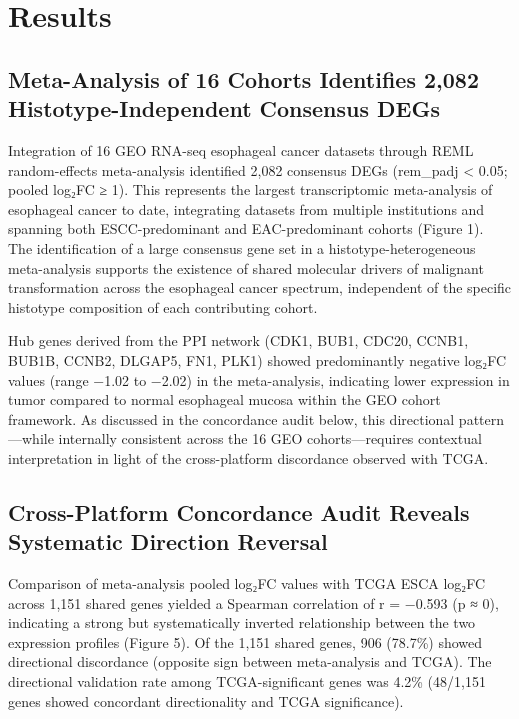 \documentclass[
  12pt,
]{article}
\begin{document}
\section{Results}\label{results}

\subsection{Meta-Analysis of 16 Cohorts Identifies 2,082
Histotype-Independent Consensus
DEGs}\label{meta-analysis-of-16-cohorts-identifies-2082-histotype-independent-consensus-degs}

Integration of 16 GEO RNA-seq esophageal cancer datasets through REML
random-effects meta-analysis identified 2,082 consensus DEGs (rem\_padj
\textless{} 0.05; \textbar pooled log₂FC\textbar{} ≥ 1). This represents
the largest transcriptomic meta-analysis of esophageal cancer to date,
integrating datasets from multiple institutions and spanning both
ESCC-predominant and EAC-predominant cohorts (Figure 1). The
identification of a large consensus gene set in a
histotype-heterogeneous meta-analysis supports the existence of shared
molecular drivers of malignant transformation across the esophageal
cancer spectrum, independent of the specific histotype composition of
each contributing cohort.

Hub genes derived from the PPI network (CDK1, BUB1, CDC20, CCNB1, BUB1B,
CCNB2, DLGAP5, FN1, PLK1) showed predominantly negative log₂FC values
(range −1.02 to −2.02) in the meta-analysis, indicating lower expression
in tumor compared to normal esophageal mucosa within the GEO cohort
framework. As discussed in the concordance audit below, this directional
pattern---while internally consistent across the 16 GEO
cohorts---requires contextual interpretation in light of the
cross-platform discordance observed with TCGA.

\subsection{Cross-Platform Concordance Audit Reveals Systematic
Direction
Reversal}\label{cross-platform-concordance-audit-reveals-systematic-direction-reversal}

Comparison of meta-analysis pooled log₂FC values with TCGA ESCA log₂FC
across 1,151 shared genes yielded a Spearman correlation of r = −0.593
(p ≈ 0), indicating a strong but systematically inverted relationship
between the two expression profiles (Figure 5). Of the 1,151 shared
genes, 906 (78.7\%) showed directional discordance (opposite sign
between meta-analysis and TCGA). The directional validation rate among
TCGA-significant genes was 4.2\% (48/1,151 genes showed concordant
directionality and TCGA significance).
\end{document}
